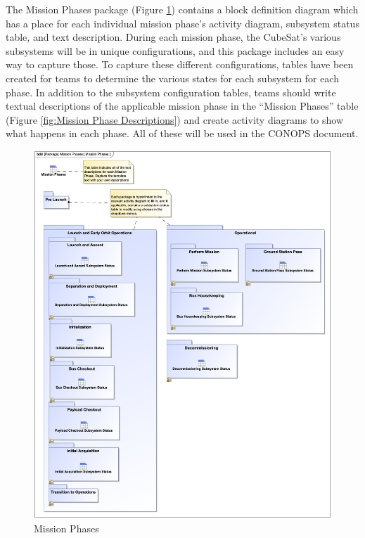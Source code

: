 The Mission Phases package (Figure \ref{fig:Mission Phases}) contains a block definition diagram which has a place for each individual mission phase's activity diagram, subsystem status table, and text description. During each mission phase, the CubeSat’s various subsystems will be in unique configurations, and this package includes an easy way to capture those. To capture these different configurations, tables have been created for teams to determine the various states for each subsystem for each phase. In addition to the subsystem configuration tables, teams should write textual descriptions of the applicable mission phase in the “Mission Phases” table (Figure \ref{fig:Mission Phase Descriptions}) and create activity diagrams to show what happens in each phase. All of these will be used in the CONOPS document. 

\begin{figure}[H]
    \centering
    \includegraphics[width=\textwidth]{Thesis/Analysis_and_Results/Analysis and Results Figures/Mission Phases.png}
    \caption{Mission Phases}
    \label{fig:Mission Phases}
\end{figure}


